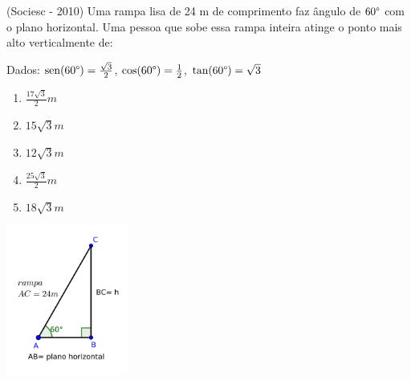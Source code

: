  \begin{exer}
 (Sociesc - 2010) Uma rampa lisa de 24 m de comprimento faz ângulo de $60\degree$ com o plano horizontal. Uma pessoa que sobe essa rampa inteira atinge o ponto mais alto verticalmente de:

  Dados: $\operatorname{sen} (60\degree)= \frac{\sqrt{3}}{2}$, $\cos (60\degree)= \frac{1}{2}$, $\tan (60\degree)= \sqrt{3}$
 \begin{multicols}{2}

 \begin{enumerate}
  \item $\frac{17 \sqrt{3}}{2} m$
  \item $15\sqrt{3} m$
  \item $12\sqrt{3} m$
  \item $\frac{25 \sqrt{3}}{2} m$
  \item $18\sqrt{3} m$
 \end{enumerate}

 \includegraphics[width=4cm]{./cap_trigon/figs/tri_ret_exer2.pdf}
 \end{multicols}
 \end{exer}
 
